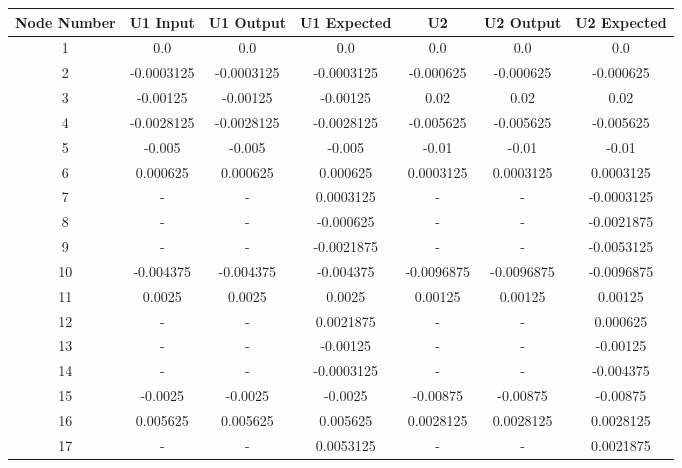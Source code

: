 \documentclass[12pt]{article}
\begin{document}
\begin{table}
	\begin{center}
		\begin{tabular}{||c c c c c c c||} 
			\hline
			Node Number & U1 Input& U1 Output  & U1 Expected & U2 & U2 Output & U2 Expected\\ [0.8ex] 
			\hline\hline
			1 & 0.0 & 0.0 & 0.0 & 0.0 & 0.0 & 0.0  \\ 
			[0.8ex]
			\hline
			2 & -0.0003125 & -0.0003125 & -0.0003125 & -0.000625 & -0.000625 & -0.000625  \\ 
			[0.8ex]
			\hline
			3 & -0.00125 & -0.00125 & -0.00125 & 0.02 & 0.02 & 0.02  \\ 
			[0.8ex]
			\hline
			4 & -0.0028125 & -0.0028125 & -0.0028125 & -0.005625 & -0.005625 & -0.005625  \\ 
			[0.8ex]
			\hline
			5 & -0.005 & -0.005 & -0.005 & -0.01 & -0.01 & -0.01 \\ 
			[0.8ex]
			\hline
			6 & 0.000625 & 0.000625 & 0.000625 & 0.0003125 & 0.0003125 & 0.0003125 \\ 
			[0.8ex]
			\hline
			\rowcolor{lightgray} 7 & - & - & 0.0003125 & - & - & -0.0003125 \\ 
			[0.8ex]
			\hline
			\rowcolor{lightgray} 8 & - & - & -0.000625 & - & - & -0.0021875 \\ 
			[0.8ex]
			\hline	
			\rowcolor{lightgray} 9 & - & - & -0.0021875 & - & - & -0.0053125  \\ 
			[0.8ex]
			\hline
			10 & -0.004375 & -0.004375 & -0.004375 & -0.0096875 & -0.0096875 & -0.0096875  \\ 
			[0.8ex]
			\hline
			11 & 0.0025 & 0.0025 & 0.0025 & 0.00125 & 0.00125 & 0.00125  \\ 
			[0.8ex]
			\hline
			\rowcolor{lightgray} 12 & - & - & 0.0021875 & - & - & 0.000625  \\ 
			[0.8ex]
			\hline
			\rowcolor{lightgray} 13 & - & - & -0.00125 & - & - & -0.00125  \\ 
			[0.8ex]
			\hline
			\rowcolor{lightgray} 14 & - & - & -0.0003125 & - & - & -0.004375 \\ 
			[0.8ex]
			\hline
			15 & -0.0025 & -0.0025 & -0.0025 & -0.00875 & -0.00875 & -0.00875 \\ 
			[0.8ex]	
			\hline
			16 & 0.005625 & 0.005625 & 0.005625 & 0.0028125 & 0.0028125 & 0.0028125 \\ 
			[0.8ex]
			\hline	
			\rowcolor{lightgray} 17 & - & - & 0.0053125 & - & - & 0.0021875  \\ 
			[0.8ex]
			\hline 
			

\end{tabular}
\end{center}
\end{table}
\end{document}
